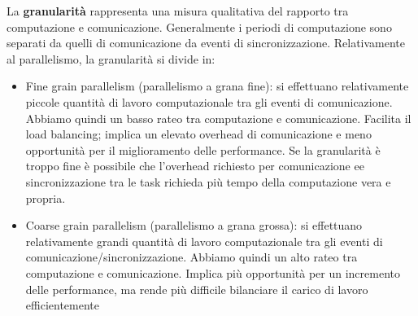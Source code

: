 La \textbf{granularità} rappresenta una misura qualitativa del rapporto tra computazione e comunicazione. Generalmente i periodi di computazione sono separati da quelli di comunicazione da eventi di sincronizzazione. Relativamente al parallelismo, la granularità si divide in:
\begin{itemize}
    \item Fine grain parallelism (parallelismo a grana fine): si effettuano relativamente piccole quantità di lavoro computazionale tra gli eventi di comunicazione. Abbiamo quindi un basso rateo tra computazione e comunicazione. Facilita il load balancing; implica un elevato overhead di comunicazione e meno opportunità per il miglioramento delle performance. Se la granularità è troppo fine è possibile che l'overhead richiesto per comunicazione ee sincronizzazione tra le task richieda più tempo della computazione vera e propria.





    \item Coarse grain parallelism (parallelismo a grana grossa): si effettuano relativamente grandi quantità di lavoro computazionale tra gli eventi di comunicazione/sincronizzazione. Abbiamo quindi un alto rateo tra computazione e comunicazione. Implica più opportunità per un incremento delle performance, ma rende più difficile bilanciare il carico di lavoro efficientemente
\end{itemize}










